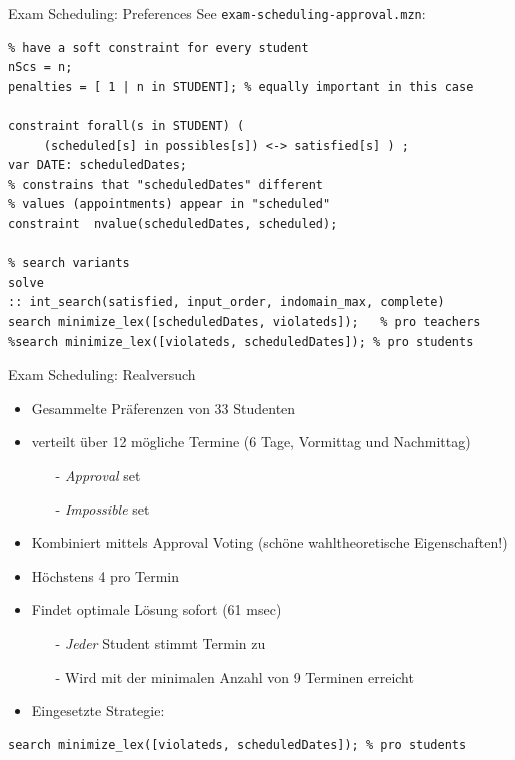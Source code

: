 \begin{frame}[fragile]{Exam Scheduling: Preferences}
See \texttt{exam-scheduling-approval.mzn}:
\begin{lstlisting}
% have a soft constraint for every student
nScs = n;
penalties = [ 1 | n in STUDENT]; % equally important in this case 

constraint forall(s in STUDENT) ( 
     (scheduled[s] in possibles[s]) <-> satisfied[s] ) ;
var DATE: scheduledDates;
% constrains that "scheduledDates" different 
% values (appointments) appear in "scheduled"
constraint  nvalue(scheduledDates, scheduled);

% search variants 
solve 
:: int_search(satisfied, input_order, indomain_max, complete)
search minimize_lex([scheduledDates, violateds]);   % pro teachers
%search minimize_lex([violateds, scheduledDates]); % pro students
\end{lstlisting}
\end{frame}


\begin{frame}[fragile]{Exam Scheduling: Realversuch}

\begin{itemize}
\item Gesammelte Präferenzen von 33 Studenten
\item verteilt über 12 mögliche Termine (6 Tage, Vormittag und Nachmittag)
\begin{itemize}
\item[-] \emph{Approval} set 
\item[-] \emph{Impossible} set 
\end{itemize}

\vspace*{2ex}

\item Kombiniert mittels \alert{Approval Voting} (schöne wahltheoretische Eigenschaften!)
\item Höchstens 4 pro Termin

\item Findet optimale Lösung sofort (61 msec) 
\begin{itemize}
\item[-] \emph{Jeder} Student stimmt Termin zu
\item[-] Wird mit der minimalen Anzahl von 9 Terminen erreicht
\end{itemize}
\item Eingesetzte Strategie:
\end{itemize}
\begin{lstlisting}
search minimize_lex([violateds, scheduledDates]); % pro students
\end{lstlisting}
\end{frame}

